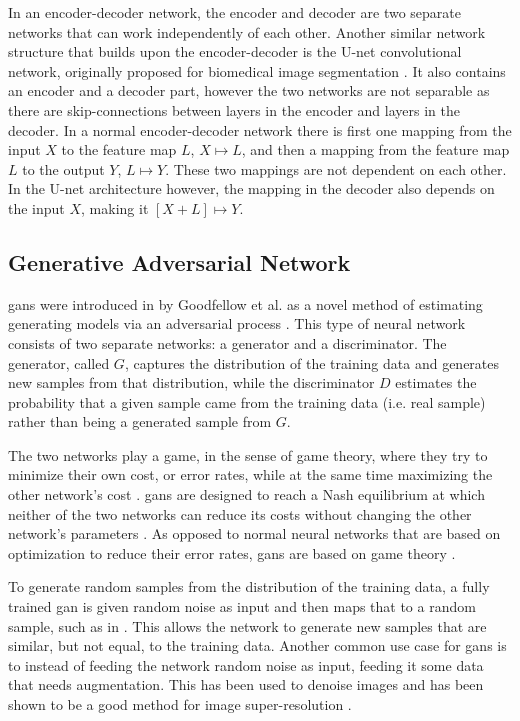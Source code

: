 In an encoder-decoder network, the encoder and decoder are two separate networks that can work independently of each other. Another similar network structure that builds upon the encoder-decoder is the U-net convolutional network, originally proposed for biomedical image segmentation \cite{unet}. It also contains an encoder and a decoder part, however the two networks are not separable as there are skip-connections between layers in the encoder and layers in the decoder. In a normal encoder-decoder network there is first one mapping from the input $X$ to the feature map $L$, $X \mapsto L$, and then a mapping from the feature map $L$ to the output $Y$, $L \mapsto Y$. These two mappings are not dependent on each other. In the U-net architecture however,  the mapping in the decoder also depends on the input $X$, making it $[X+L] \mapsto Y$. 


\subsection{Generative Adversarial Network}
\label{sec:ml:types:gan}
\acrfull{gan}s were introduced in \citeyear{goodfellow2014gan} by Goodfellow et al.  as a novel method of estimating generating models via an adversarial process \cite{goodfellow2014gan}. This type of neural network consists of two separate networks: a generator and a discriminator. The generator, called $G$, captures the distribution of the training data and generates new samples from that distribution, while the discriminator $D$ estimates the probability that a given sample came from the training data (i.e. real sample) rather than being a generated sample from $G$. 

The two networks play a game, in the sense of game theory, where they try to minimize their own cost, or error rates, while at the same time maximizing the other network's cost \cite{goodfellow2020gan}. \acrshort{gan}s are designed to reach a Nash equilibrium at which neither of the two networks can reduce its costs without changing the other network's parameters \cite{liu2020tomogan}. As opposed to normal neural networks that are based on optimization to reduce their error rates, \acrshort{gan}s are based on game theory \cite{goodfellow2020gan}. 

To generate random samples from the distribution of the training data, a fully trained \acrshort{gan} is given random noise as input and then maps that to a random sample, such as in \cite{zhangsagan}. This allows the network to generate new samples that are similar, but not equal, to the training data. Another common use case for \acrshort{gan}s is to instead of feeding the network random noise as input, feeding it some data that needs augmentation. This has been used to denoise images and has been shown to be a good method for image super-resolution \cite{8710893,Ledig_2017_CVPR}. 


